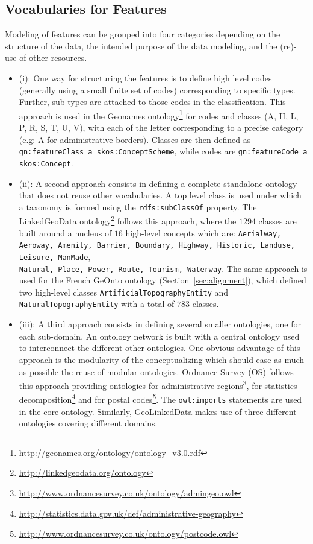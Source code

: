 \subsection{Vocabularies for Features}
Modeling of features can be grouped into four categories depending on the structure of the data, the intended purpose of the data modeling, and the (re)-use of other resources.
\begin{itemize}
  \item (i): One way for structuring the features is to define high level codes (generally using a small finite set of codes) corresponding to specific
      types. Further, sub-types are attached to those codes in the classification. This approach is used in the Geonames ontology\footnote{\url{http://geonames.org/ontology/ontology_v3.0.rdf}} for codes and classes (A, H, L, P, R, S, T, U, V), with each of the letter corresponding to a precise category (e.g: A for administrative borders). Classes are then defined as \texttt{gn:featureClass a skos:ConceptScheme}, while codes are \texttt{gn:featureCode a skos:Concept}.
  \item (ii): A second approach consists in defining a complete standalone ontology that does not reuse other vocabularies. A top level class is used under which a taxonomy is formed using the \texttt{rdfs:subClassOf} property. The LinkedGeoData ontology\footnote{\url{http://linkedgeodata.org/ontology}} follows this approach, where the $1294$ classes are built around a nucleus of $16$ high-level concepts which are: \texttt{Aerialway, Aeroway, Amenity, Barrier, Boundary, Highway, Historic, Landuse, Leisure, ManMade},\\ \texttt{Natural, Place, Power, Route, Tourism, Waterway}. The same approach is used for the French GeOnto ontology (Section~\ref{sec:alignment}), which defined two high-level classes \texttt{ArtificialTopographyEntity} and \texttt{Natural\-TopographyEntity} with a total of $783$ classes.
  \item (iii): A third approach consists in defining several smaller ontologies, one for each sub-domain. An ontology network is built with a central ontology used to interconnect the different other ontologies. One obvious advantage of this approach is the modularity of the conceptualizing which should ease as much as possible the reuse of modular ontologies. Ordnance Survey (OS) follows this approach providing ontologies for administrative regions\footnote{\url{http://www.ordnancesurvey.co.uk/ontology/admingeo.owl}}, for statistics decomposition\footnote{\url{http://statistics.data.gov.uk/def/administrative-geography}} and for postal codes\footnote{\url{http://www.ordnancesurvey.co.uk/ontology/postcode.owl}}. The \texttt{owl:imports} statements are used in the core ontology. Similarly, GeoLinkedData makes use of three different ontologies covering different domains.

\end{itemize}
